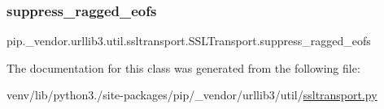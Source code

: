 \subsubsection{\texorpdfstring{suppress\+\_\+ragged\+\_\+eofs}{suppress\_ragged\_eofs}}
{\footnotesize\ttfamily pip.\+\_\+vendor.\+urllib3.\+util.\+ssltransport.\+S\+S\+L\+Transport.\+suppress\+\_\+ragged\+\_\+eofs}



The documentation for this class was generated from the following file\+:\begin{DoxyCompactItemize}
\item 
venv/lib/python3./site-\/packages/pip/\+\_\+vendor/urllib3/util/\hyperlink{ssltransport_8py}{ssltransport.\+py}\end{DoxyCompactItemize}
